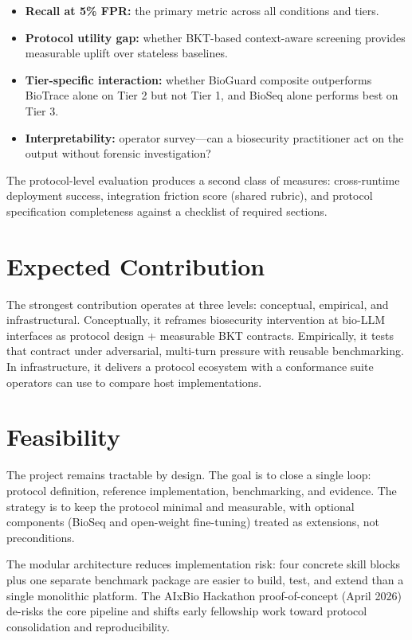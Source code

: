 \documentclass[10.5pt,a4paper]{article}
\begin{document}
\begin{itemize}[leftmargin=1.2em]
  \item \textbf{Recall at 5\% FPR:} the primary metric across all conditions and tiers.
  \item \textbf{Protocol utility gap:} whether BKT-based context-aware screening provides measurable uplift over stateless baselines.
  \item \textbf{Tier-specific interaction:} whether BioGuard composite outperforms BioTrace alone on Tier 2 but not Tier 1, and BioSeq alone performs best on Tier 3.
  \item \textbf{Interpretability:} operator survey---can a biosecurity practitioner act on the output without forensic investigation?
\end{itemize}

The protocol-level evaluation produces a second class of measures: cross-runtime deployment success, integration friction score (shared rubric), and protocol specification completeness against a checklist of required sections.

\section*{Expected Contribution}

The strongest contribution operates at three levels: conceptual, empirical, and infrastructural. Conceptually, it reframes biosecurity intervention at bio-LLM interfaces as protocol design + measurable BKT contracts. Empirically, it tests that contract under adversarial, multi-turn pressure with reusable benchmarking. In infrastructure, it delivers a protocol ecosystem with a conformance suite operators can use to compare host implementations.

\section*{Feasibility}

The project remains tractable by design. The goal is to close a single loop: protocol definition, reference implementation, benchmarking, and evidence. The strategy is to keep the protocol minimal and measurable, with optional components (BioSeq and open-weight fine-tuning) treated as extensions, not preconditions.

The modular architecture reduces implementation risk: four concrete skill blocks plus one separate benchmark package are easier to build, test, and extend than a single monolithic platform. The AIxBio Hackathon proof-of-concept (April 2026) de-risks the core pipeline and shifts early fellowship work toward protocol consolidation and reproducibility.
\end{document}
